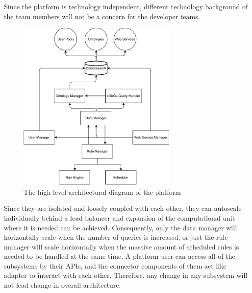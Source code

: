Since the platform is technology independent, different technology background of the team members will not be a concern for the developer teams. 
\begin{figure}[h]
  \centering
  \includegraphics[width=0.7\textwidth,height=\textheight,keepaspectratio]{figures/high_level_architectural_diagram.pdf}
  \caption[Platform Architecture]{The high level architectural diagram of the platform}\label{fig:architecture}
\end{figure}

Since they are isolated and loosely coupled with each other, they can autoscale individually behind a load balancer and expansion of the computational unit where it is needed can be achieved. Consequently, only the data manager will horizontally scale when the number of queries is increased, or just the rule manager will scale horizontally when the massive amount of scheduled rules is needed to be handled at the same time. A platform user can access all of the subsystems by their APIs, and the connector components of them act like adapter to interact with each other. Therefore, any change in any subsystem will not lead change in overall architecture.
